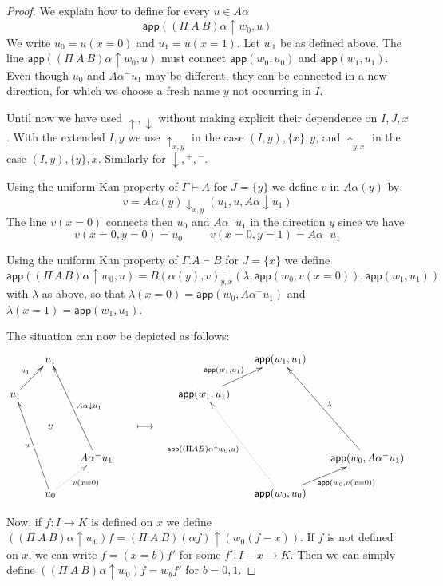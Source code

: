 \documentclass[10pt,a4paper]{article}
\newcommand{\app}{\mathsf{app}}
\newcommand{\set}[1]{\{#1\}}
\newcommand{\lto}{\longmapsto}
\newcommand{\rup}[1]{#1{\uparrow}}
\newcommand{\rdo}[1]{#1{\downarrow}}
\newcommand{\rupxy}[1]{#1{\uparrow_{x,y}}}
\newcommand{\rdoxy}[1]{#1{\downarrow_{x,y}}}
\newcommand{\rupyx}[1]{#1{\uparrow_{y,x}}}
\begin{document}
\begin{proof}
We explain how to define for every $u\in A\alpha$
$$
\app(\rup{(\Pi~A~B)\alpha} w_0,u)
$$
We write $u_0 = u(x=0)$ and $u_1 = u(x=1)$.
Let $w_1$ be as defined above.
The line $\app((\Pi~A~B)\alpha\uparrow w_0,u)$ must
connect $\app(w_0,u_0)$ and $\app(w_1,u_1)$.
Even though $u_0$ and $A\alpha^- u_1$ may be different, they can
be connected in a new direction, for which we choose a fresh name $y$ not occurring in $I$.

Until now we have used $\rup{},\rdo{}$ without making explicit their dependence
on $I,J,x$. With the extended $I,y$ we use $\rupxy{}$ in the case $(I,y),\set{x},y$,
and $\rupyx{}$ in the case $(I,y),\set{y},x$. Similarly for $\rdo{},{}^+,{}^-$.

Using the uniform Kan property of $\Gamma\vdash A$ for $J=\set{y}$
we define $v$ in $A\alpha(y)$ by
$$
v = \rdoxy{A\alpha(y)}(u_1,u,\rdo{A\alpha} u_1)
$$
The line $v(x=0)$
connects then $u_0$ and $A\alpha^-u_1$ in the direction $y$ since we have
$$
v(x=0,y=0) = u_0~~~~~~~~~~~v(x=0,y=1) = A\alpha^- u_1
$$

Using the uniform Kan property of $\Gamma.A\vdash B$ for $J=\set{x}$ we define
$$
\app(\rup{(\Pi\,A\,B)\alpha} w_0,u) =
{B(\alpha(y),v)}^-_{y,x}(\lambda,\app(w_0,v(x=0)),\app(w_1,u_1))
$$
with $\lambda$ as above,
so that $\lambda(x=0) = \app(w_0,A\alpha^- u_1)$ and $\lambda(x=1) = \app(w_1,u_1)$.

The situation can now be depicted as follows:
\[
\xymatrix@R=.6cm@C=.6cm{
&u_1&                                                                          &&  &\app(w_1,u_1)&\\
u_1\ar[ur]^{u_1}&&                                               &&  \app(w_1,u_1)\ar[ur]^{ \app(w_1,u_1)~~~}&&\\
&v&                                                                          &\lto& &   &\\
&&A\alpha^- u_1\ar[uuul]_{\rdo{A\alpha}u_1}     &&  &&\app(w_0,A\alpha^- u_1)\ar[uuul]_{\lambda} \\
&u_0\ar[uuul]^u \ar@{.>}[ur]_{v(x=0)}&                 &&  &\app(w_0,u_0)\ar@{.>}[uuul]^{\app(\rup{(\Pi A B)\alpha} w_0,u)} \ar[ur]_{~~~~\app(w_0,v(x=0))}&\\
}
\]

Now, if $f:I\to K$ is defined on $x$ we define
$(\rup{(\Pi~A~B)\alpha} w_0) f = \rup{(\Pi~A~B)(\alpha f)} (w_0 (f-x))$.
If $f$ is not defined on $x$, we can write $f=(x=b)f'$ for some $f':I-x \to K$.
Then we can simply define $(\rup{(\Pi~A~B)\alpha} w_0) f = w_b f'$ for $b=0,1$.
\end{proof}
\end{document}
